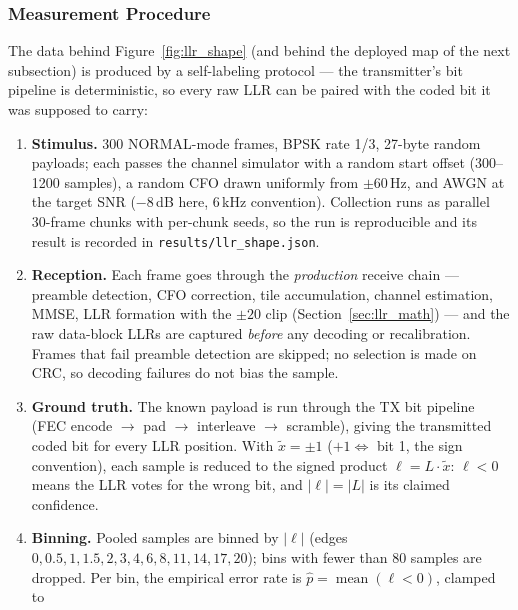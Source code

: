 \subsubsection{Measurement Procedure}
\label{sec:llr_procedure}

The data behind Figure~\ref{fig:llr_shape} (and behind the deployed
map of the next subsection) is produced by a self-labeling protocol
--- the transmitter's bit pipeline is deterministic, so every raw LLR
can be paired with the coded bit it was supposed to carry:

\begin{enumerate}
    \item \textbf{Stimulus.}  300 NORMAL-mode frames, BPSK rate 1/3,
          27-byte random payloads; each passes the channel simulator
          with a random start offset (300--1200 samples), a random
          CFO drawn uniformly from $\pm 60$\,Hz, and AWGN at the
          target SNR ($-8$\,dB here, 6\,kHz convention).  Collection
          runs as parallel 30-frame chunks with per-chunk seeds, so
          the run is reproducible and its result is recorded in
          \texttt{results/llr\_shape.json}.
    \item \textbf{Reception.}  Each frame goes through the
          \emph{production} receive chain --- preamble detection,
          CFO correction, tile accumulation, channel estimation, MMSE,
          LLR formation with the $\pm 20$ clip
          (Section~\ref{sec:llr_math}) --- and the raw data-block
          LLRs are captured \emph{before} any decoding or
          recalibration.  Frames that fail preamble detection are
          skipped; no selection is made on CRC, so decoding failures
          do not bias the sample.
    \item \textbf{Ground truth.}  The known payload is run through
          the TX bit pipeline (FEC encode $\to$ pad $\to$ interleave
          $\to$ scramble), giving the transmitted coded bit for every
          LLR position.  With $\tilde{x} = \pm 1$ ($+1 \Leftrightarrow$
          bit 1, the sign convention), each sample is reduced to the
          signed product $\ell = L \cdot \tilde{x}$: $\ell < 0$ means
          the LLR votes for the wrong bit, and $|\ell| = |L|$ is its
          claimed confidence.
    \item \textbf{Binning.}  Pooled samples are binned by $|\ell|$
          (edges $0, 0.5, 1, 1.5, 2, 3, 4, 6, 8, 11, 14, 17, 20$);
          bins with fewer than 80 samples are dropped.  Per bin, the
          empirical error rate is
          $\hat{p} = \operatorname{mean}(\ell < 0)$, clamped to

\end{enumerate}
